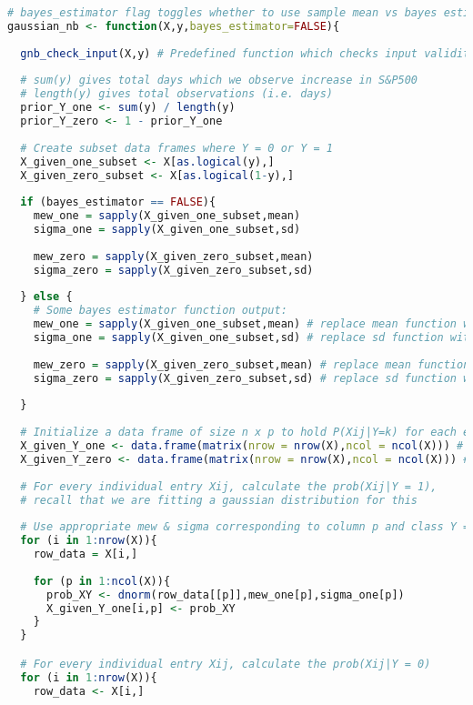 \documentclass{article}
\begin{document}
\begin{lstlisting}[language=R]
# bayes_estimator flag toggles whether to use sample mean vs bayes estimator
gaussian_nb <- function(X,y,bayes_estimator=FALSE){
  
  gnb_check_input(X,y) # Predefined function which checks input validity
  
  # sum(y) gives total days which we observe increase in S&P500
  # length(y) gives total observations (i.e. days)
  prior_Y_one <- sum(y) / length(y)
  prior_Y_zero <- 1 - prior_Y_one 
  
  # Create subset data frames where Y = 0 or Y = 1 
  X_given_one_subset <- X[as.logical(y),]
  X_given_zero_subset <- X[as.logical(1-y),]
    
  if (bayes_estimator == FALSE){
    mew_one = sapply(X_given_one_subset,mean)
    sigma_one = sapply(X_given_one_subset,sd)
    
    mew_zero = sapply(X_given_zero_subset,mean)
    sigma_zero = sapply(X_given_zero_subset,sd)
    
  } else {
    # Some bayes estimator function output:
    mew_one = sapply(X_given_one_subset,mean) # replace mean function with something else!
    sigma_one = sapply(X_given_one_subset,sd) # replace sd function with something else!
    
    mew_zero = sapply(X_given_zero_subset,mean) # replace mean function with something else!
    sigma_zero = sapply(X_given_zero_subset,sd) # replace sd function with something else!
    
  }  
  
  # Initialize a data frame of size n x p to hold P(Xij|Y=k) for each entry of matrix X
  X_given_Y_one <- data.frame(matrix(nrow = nrow(X),ncol = ncol(X))) # Y = 1
  X_given_Y_zero <- data.frame(matrix(nrow = nrow(X),ncol = ncol(X))) # Y = 0 
  
  # For every individual entry Xij, calculate the prob(Xij|Y = 1), 
  # recall that we are fitting a gaussian distribution for this
  
  # Use appropriate mew & sigma corresponding to column p and class Y = k
  for (i in 1:nrow(X)){
    row_data = X[i,] 
    
    for (p in 1:ncol(X)){
      prob_XY <- dnorm(row_data[[p]],mew_one[p],sigma_one[p])
      X_given_Y_one[i,p] <- prob_XY
    }    
  }

  # For every individual entry Xij, calculate the prob(Xij|Y = 0)  
  for (i in 1:nrow(X)){
    row_data <- X[i,] 
    

\end{lstlisting}
\end{document}
